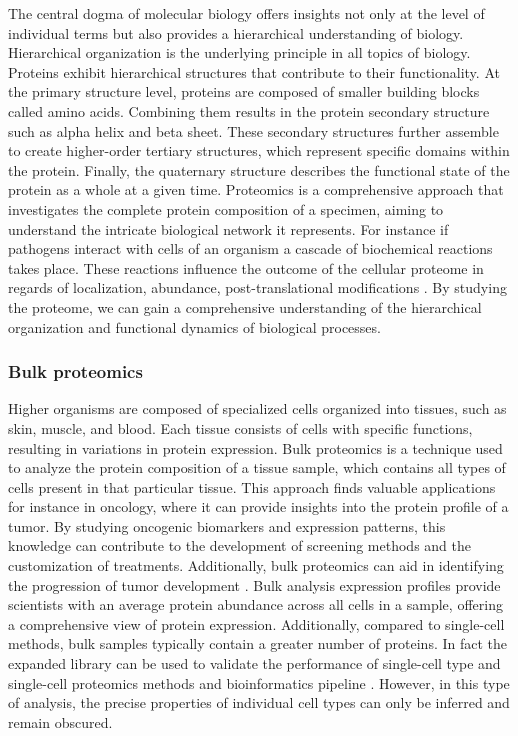 \documentclass[
  11pt,
]{article}
\begin{document}
The central dogma of molecular biology offers insights not only at the
level of individual terms but also provides a hierarchical understanding
of biology. Hierarchical organization is the underlying principle in all
topics of biology. Proteins exhibit hierarchical structures that
contribute to their functionality. At the primary structure level,
proteins are composed of smaller building blocks called amino acids.
Combining them results in the protein secondary structure such as alpha
helix and beta sheet. These secondary structures further assemble to
create higher-order tertiary structures, which represent specific
domains within the protein. Finally, the quaternary structure describes
the functional state of the protein as a whole at a given time.
Proteomics is a comprehensive approach that investigates the complete
protein composition of a specimen, aiming to understand the intricate
biological network it represents. For instance if pathogens interact
with cells of an organism a cascade of biochemical reactions takes
place. These reactions influence the outcome of the cellular proteome in
regards of localization, abundance, post-translational modifications
\citep{Beltran2017}. By studying the proteome, we can gain a
comprehensive understanding of the hierarchical organization and
functional dynamics of biological processes.

\hypertarget{bulk-proteomics}{%
\subsubsection{Bulk proteomics}\label{bulk-proteomics}}

Higher organisms are composed of specialized cells organized into
tissues, such as skin, muscle, and blood. Each tissue consists of cells
with specific functions, resulting in variations in protein expression.
Bulk proteomics is a technique used to analyze the protein composition
of a tissue sample, which contains all types of cells present in that
particular tissue. This approach finds valuable applications for
instance in oncology, where it can provide insights into the protein
profile of a tumor. By studying oncogenic biomarkers and expression
patterns, this knowledge can contribute to the development of screening
methods and the customization of treatments. Additionally, bulk
proteomics can aid in identifying the progression of tumor development
\citep{Kwon2021}. Bulk analysis expression profiles provide scientists
with an average protein abundance across all cells in a sample, offering
a comprehensive view of protein expression. Additionally, compared to
single-cell methods, bulk samples typically contain a greater number of
proteins. In fact the expanded library can be used to validate the
performance of single-cell type and single-cell proteomics methods and
bioinformatics pipeline \citep{Schoof2021}. However, in this type of
analysis, the precise properties of individual cell types can only be
inferred and remain obscured.
\end{document}
